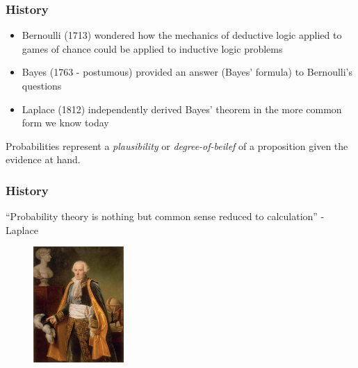 \begin{frame}

\frametitle{History}
\label{history}

\begin{itemize}
\item Bernoulli (1713) wondered how the mechanics of deductive logic applied to games of chance
could be applied to inductive logic problems

\item Bayes (1763 - postumous) provided an answer (Bayes' formula) to Bernoulli's questions

\item Laplace (1812) independently derived Bayes' theorem in the more common form we know today

\end{itemize}

Probabilities represent a \emph{plausibility} or \emph{degree-of-beilef} of a proposition given the evidence at hand.

\end{frame}

\begin{frame}

\frametitle{History}
\label{history}

``Probability theory is nothing but common sense reduced to calculation'' - Laplace

\begin{figure}[htbp]
\centering
\includegraphics[keepaspectratio,width=\textwidth,height=125pt]{figures/laplace.jpg}
\label{laplace}
\end{figure}

\end{frame}

